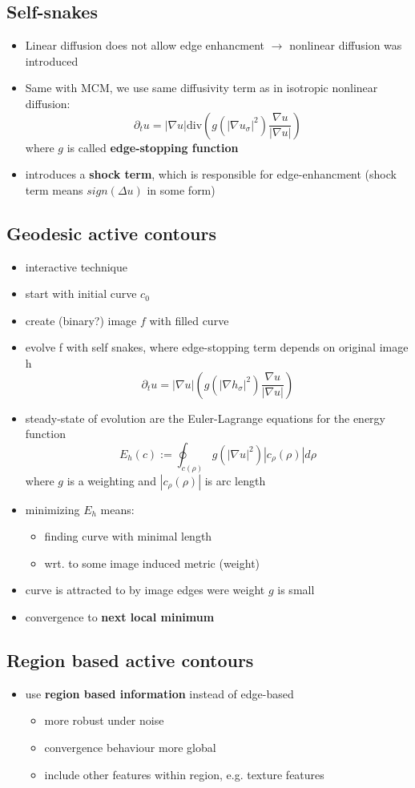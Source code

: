 \documentclass[11pt]{article}
\begin{document}
\subsection{Self-snakes}
\label{sec-8-4}
\begin{itemize}
\item Linear diffusion does not allow edge enhancment $\rightarrow$ nonlinear diffusion was introduced
\item Same with MCM, we use same diffusivity term as in isotropic nonlinear diffusion:
\[ \partial_t u = |\nabla u| \text{div}\left( g(|\nabla u_\sigma|^2)
        \frac{\nabla u}{|\nabla u|}\right) \]
where $g$ is called \textbf{edge-stopping function}
\item introduces a \textbf{shock term}, which is responsible for edge-enhancment
(shock term means $sign(\Delta u)$ in some form)
\end{itemize}
\subsection{Geodesic active contours}
\label{sec-8-5}
\begin{itemize}
\item interactive technique
\item start with initial curve $c_0$
\item create (binary?) image $f$ with filled curve
\item evolve f with self snakes, where edge-stopping term depends on original image h
     \[ \partial_t u = |\nabla u| \left( g(|\nabla h_\sigma|^2) 
        \frac{\nabla u}{|\nabla u|} \right) \]
\item steady-state of evolution are the Euler-Lagrange equations for the energy function
\[ E_h(c):= \oint_{c(\rho)} g(|\nabla u|^2) |c_\rho(\rho)| d\rho \]
where $g$ is a weighting and $|c_\rho(\rho)|$ is arc length
\item minimizing $E_h$ means:
\begin{itemize}
\item finding curve with minimal length
\item wrt. to some image induced metric (weight)
\end{itemize}
\item curve is attracted to by image edges were weight $g$ is small
\item convergence to \textbf{next local minimum}
\end{itemize}
\subsection{Region based active contours}
\label{sec-8-6}
\begin{itemize}
\item use \textbf{region based information} instead of edge-based
\begin{itemize}
\item more robust under noise
\item convergence behaviour more global
\item include other features within region, e.g. texture features
\end{itemize}
\end{itemize}
\end{document}
